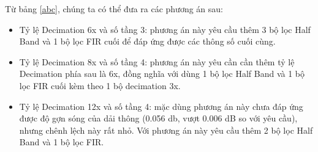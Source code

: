  \noindent Từ bảng \ref{abc}, chúng ta có thể đưa ra các phương án sau:
\begin{itemize}
    \item Tỷ lệ Decimation 6x và số tầng 3: phương án này yêu cầu thêm 3 bộ lọc Half Band và 1 bộ lọc FIR cuối để đáp ứng được các thông số cuối cùng.
    \item Tỷ lệ Decimation 8x và số tầng 4: phương án này yêu cần cần thêm tỷ lệ Decimation phía sau là 6x, đồng nghĩa với dùng 1 bộ lọc Half Band và 1 bộ lọc FIR cuối kèm theo 1 bộ decimation 3x.
    \item Tỷ lệ Decimation 12x và số tầng 4: mặc dùng phương án này chưa đáp ứng được độ gợn sóng của dải thông (0.056 db, vượt 0.006 dB so với yêu cầu), nhưng chênh lệch này rất nhỏ. Với phương án này yêu cầu thêm 2 bộ lọc Half Band và 1 bộ lọc FIR. \label{choose}
\end{itemize}

